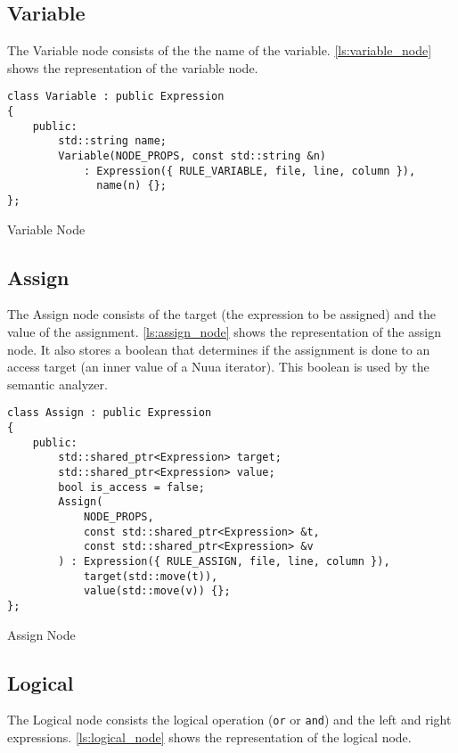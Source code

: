 \subsection{Variable}

The Variable node consists of the the name of the variable. \autoref{ls:variable_node} shows the representation of the variable node.

\begin{listing}[H]
\begin{verbatim}
class Variable : public Expression
{
    public:
        std::string name;
        Variable(NODE_PROPS, const std::string &n)
            : Expression({ RULE_VARIABLE, file, line, column }),
              name(n) {};
};
\end{verbatim}
\caption{Variable Node}
\label{ls:variable_node}
\end{listing}

\subsection{Assign}

The Assign node consists of the target (the expression to be assigned) and the value of the assignment.
\autoref{ls:assign_node} shows the representation of the assign node. It also stores a boolean that determines if
the assignment is done to an access target (an inner value of a Nuua iterator). This boolean is used by the semantic analyzer.

\begin{listing}[H]
\begin{verbatim}
class Assign : public Expression
{
    public:
        std::shared_ptr<Expression> target;
        std::shared_ptr<Expression> value;
        bool is_access = false;
        Assign(
            NODE_PROPS,
            const std::shared_ptr<Expression> &t,
            const std::shared_ptr<Expression> &v
        ) : Expression({ RULE_ASSIGN, file, line, column }),
            target(std::move(t)),
            value(std::move(v)) {};
};
\end{verbatim}
\caption{Assign Node}
\label{ls:assign_node}
\end{listing}

\subsection{Logical}

The Logical node consists the logical operation (\texttt{or} or \texttt{and}) and the left and right expressions.
\autoref{ls:logical_node} shows the representation of the logical node.

